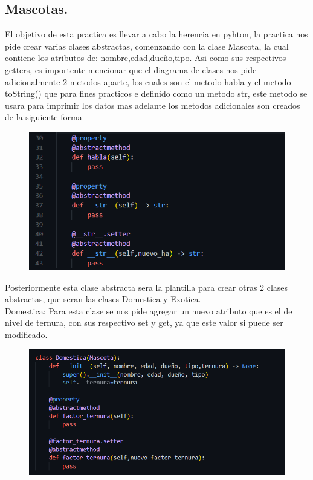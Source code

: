 \documentclass[12pt]{article}
\begin{document}
\subsection{Mascotas.}
El objetivo de esta practica es llevar a cabo la herencia en pyhton, la practica nos pide crear varias clases abstractas, comenzando con la clase Mascota, la cual contiene los atributos de: nombre,edad,dueño,tipo. Asi como sus respectivos getters, es importente mencionar que el diagrama de clases nos pide adicionalmente 2 metodos aparte, los cuales son el metodo habla y el metodo toString() que para fines practicos e definido como un metodo str, este metodo se usara para imprimir los datos mas adelante
los metodos adicionales son creados de la siguiente forma
\begin{figure}[H]
		\begin{center}
 			\includegraphics[width = .9\textwidth]{09.png}
 			 	
		\end{center} 
\end{figure}

Posteriormente esta clase abstracta sera la plantilla para crear otras 2 clases abstractas, que seran las clases Domestica y Exotica.\\
Domestica: Para esta clase se  nos pide agregar un nuevo atributo que es el de nivel de ternura, con sus respectivo set y get, ya que este valor si puede ser modificado.
\begin{figure}[H]
		\begin{center}
 			\includegraphics[width = .9\textwidth]{10.png}
 			 	
		\end{center} 
\end{figure}
\end{document}
